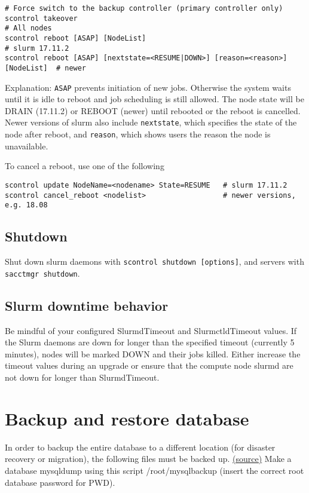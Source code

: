 \begin{verbatim}
# Force switch to the backup controller (primary controller only)
scontrol takeover
# All nodes
scontrol reboot [ASAP] [NodeList]                                       # slurm 17.11.2
scontrol reboot [ASAP] [nextstate=<RESUME|DOWN>] [reason=<reason>] [NodeList]  # newer
\end{verbatim}

Explanation: \texttt{ASAP} prevents initiation of new jobs. Otherwise the system waits until it is idle to reboot and job scheduling is still allowed. The node state will be DRAIN (17.11.2) or REBOOT (newer) until rebooted or the reboot is cancelled. Newer versions of slurm also include \texttt{nextstate}, which specifies the state of the node after reboot, and \texttt{reason}, which shows users the reason the node is unavailable.

To cancel a reboot, use one of the following

\begin{verbatim}
scontrol update NodeName=<nodename> State=RESUME   # slurm 17.11.2
scontrol cancel_reboot <nodelist>                  # newer versions, e.g. 18.08
\end{verbatim}

\subsection{Shutdown} \label{subsec:slurmshutdown}

Shut down slurm daemons with \texttt{scontrol shutdown [options]}, and servers with \texttt{sacctmgr shutdown}.

\subsection{Slurm downtime behavior} \label{subsec:slurmdowntime}
Be mindful of your configured SlurmdTimeout and SlurmctldTimeout values. If the Slurm daemons are down for longer than the specified timeout (currently 5 minutes), nodes will be marked DOWN and their jobs killed. Either increase the timeout values during an upgrade or ensure that the compute node slurmd are not down for longer than SlurmdTimeout. 

\section{Backup and restore database} \label{sec:slurmDBbackup}

In order to backup the entire database to a different location (for disaster recovery or migration), the following files must be backed up. \href{https://wiki.fysik.dtu.dk/niflheim/Slurm_database#backup-and-restore-of-database}{(source)} Make a database mysqldump using this script /root/mysqlbackup (insert the correct root database password for PWD). 

